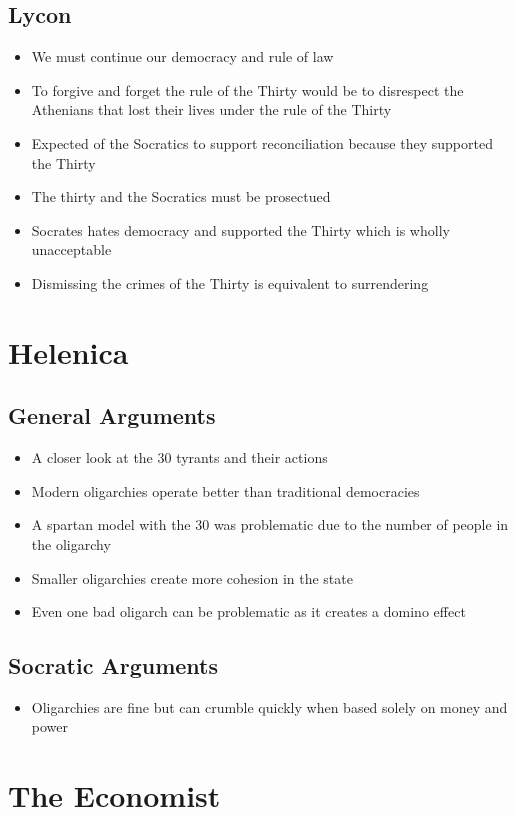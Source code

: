 \documentclass[11pt]{article}
\begin{document}
\subsection{Lycon}
\label{sec:orgc1d9066}
\begin{itemize}
\item We must continue our democracy and rule of law
\item To forgive and forget the rule of the Thirty would be to disrespect the Athenians that lost
their lives under the rule of the Thirty
\item Expected of the Socratics to support reconciliation because they supported the Thirty
\item The thirty and the Socratics must be prosectued
\item Socrates hates democracy and supported the Thirty which is wholly unacceptable
\item Dismissing the crimes of the Thirty is equivalent to surrendering
\end{itemize}
\section{Helenica}
\label{sec:org3bccc3a}
\subsection{General Arguments}
\label{sec:org8b23ea0}
\begin{itemize}
\item A closer look at the 30 tyrants and their actions
\item Modern oligarchies operate better than traditional democracies
\item A spartan model with the 30 was problematic due to the number of people in the oligarchy
\item Smaller oligarchies create more cohesion in the state
\item Even one bad oligarch can be problematic as it creates a domino effect
\end{itemize}
\subsection{Socratic Arguments}
\label{sec:orgd4164a5}
\begin{itemize}
\item Oligarchies are fine but can crumble quickly when based solely on money and power
\end{itemize}
\section{The Economist}
\label{sec:orgc359654}
\end{document}
